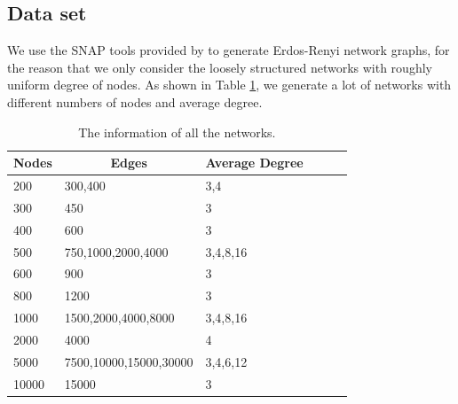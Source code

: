 \subsection{Data set}
We use the SNAP tools provided by \cite{snap} to generate Erdos-Renyi network graphs, for the reason that we only consider the loosely structured networks with roughly uniform degree of nodes. As shown in Table \ref{tab:t1}, we generate a lot of networks with different numbers of nodes and average degree. 
\begin{table}[h]
	\centering
	\begin{tabular}{|l|l|l|l|l|l|}
		\hline
		Nodes & \multicolumn{1}{c|}{Edges} & Average Degree \\ \hline
		200   & 300,400                    & 3,4            \\ \hline
		300   & 450                        & 3              \\ \hline
		400   & 600                        & 3              \\ \hline
		500   & 750,1000,2000,4000         & 3,4,8,16       \\ \hline
		600   & 900                        & 3              \\ \hline
		800   & 1200                       & 3              \\ \hline
		1000  & 1500,2000,4000,8000        & 3,4,8,16       \\ \hline
		2000  & 4000                       & 4              \\ \hline
		5000  & 7500,10000,15000,30000     & 3,4,6,12       \\ \hline
		10000 & 15000                      & 3              \\ \hline
	\end{tabular}
	\caption{The information of all the networks.}
	\label{tab:t1}
\end{table}
